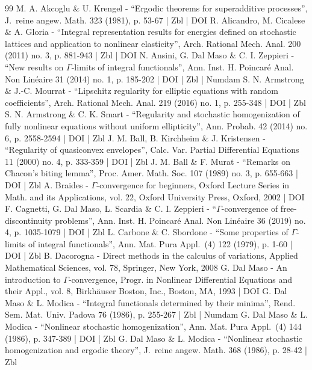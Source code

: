 \documentclass[10pt]{amsart}
\theoremstyle{definition}
\begin{document}
\begin{thebibliography}{99}
M. A. Akcoglu \& U. Krengel - “Ergodic theorems for superadditive processes”, J. reine angew. Math. 323 (1981), p. 53-67 | Zbl | DOI
R. Alicandro, M. Cicalese \& A. Gloria - “Integral representation results for energies defined on stochastic lattices and application to nonlinear elasticity”, Arch. Rational Mech. Anal. 200 (2011) no. 3, p. 881-943 | Zbl | DOI
N. Ansini, G. Dal Maso \& C. I. Zeppieri - “New results on $\Gamma $-limits of integral functionals”, Ann. Inst. H. Poincaré Anal. Non Linéaire 31 (2014) no. 1, p. 185-202 | DOI | Zbl | Numdam
S. N. Armstrong \& J.-C. Mourrat - “Lipschitz regularity for elliptic equations with random coefficients”, Arch. Rational Mech. Anal. 219 (2016) no. 1, p. 255-348 | DOI | Zbl
S. N. Armstrong \& C. K. Smart - “Regularity and stochastic homogenization of fully nonlinear equations without uniform ellipticity”, Ann. Probab. 42 (2014) no. 6, p. 2558-2594 | DOI | Zbl
J. M. Ball, B. Kirchheim \& J. Kristensen - “Regularity of quasiconvex envelopes”, Calc. Var. Partial Differential Equations 11 (2000) no. 4, p. 333-359 | DOI | Zbl
J. M. Ball \& F. Murat - “Remarks on Chacon’s biting lemma”, Proc. Amer. Math. Soc. 107 (1989) no. 3, p. 655-663 | DOI | Zbl
A. Braides - $\Gamma $-convergence for beginners, Oxford Lecture Series in Math. and its Applications, vol. 22, Oxford University Press, Oxford, 2002 | DOI
F. Cagnetti, G. Dal Maso, L. Scardia \& C. I. Zeppieri - “$\Gamma $-convergence of free-discontinuity problems”, Ann. Inst. H. Poincaré Anal. Non Linéaire 36 (2019) no. 4, p. 1035-1079 | DOI | Zbl
L. Carbone \& C. Sbordone - “Some properties of $\Gamma $-limits of integral functionals”, Ann. Mat. Pura Appl. (4) 122 (1979), p. 1-60 | DOI | Zbl
B. Dacorogna - Direct methods in the calculus of variations, Applied Mathematical Sciences, vol. 78, Springer, New York, 2008
G. Dal Maso - An introduction to $\Gamma $-convergence, Progr. in Nonlinear Differential Equations and their Appl., vol. 8, Birkhäuser Boston, Inc., Boston, MA, 1993 | DOI
G. Dal Maso \& L. Modica - “Integral functionals determined by their minima”, Rend. Sem. Mat. Univ. Padova 76 (1986), p. 255-267 | Zbl | Numdam
G. Dal Maso \& L. Modica - “Nonlinear stochastic homogenization”, Ann. Mat. Pura Appl. (4) 144 (1986), p. 347-389 | DOI | Zbl
G. Dal Maso \& L. Modica - “Nonlinear stochastic homogenization and ergodic theory”, J. reine angew. Math. 368 (1986), p. 28-42 | Zbl

\end{thebibliography}
\end{document}

